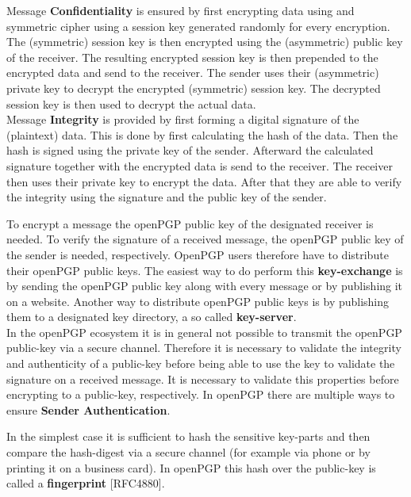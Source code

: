 Message \textbf{Confidentiality} is ensured by first encrypting data using and symmetric cipher using a session key generated randomly for every encryption. The (symmetric) session key is then encrypted using the (asymmetric) public key of the receiver. The resulting encrypted session key is then prepended to the encrypted data and send to the receiver. The sender uses their (asymmetric) private key to decrypt the encrypted (symmetric) session key. The decrypted session key is then used to decrypt the actual data.\\


Message \textbf{Integrity} is provided by first forming a digital signature of the (plaintext) data. This is done by first calculating the hash of the data. Then the hash is signed using the private key of the sender. Afterward the calculated signature together with the encrypted data is send to the receiver. The receiver then uses their private key to encrypt the data. After that they are able to verify the integrity using the signature and the public key of the sender.

To encrypt a message the openPGP public key of the designated receiver is needed. To verify the signature of a received message, the openPGP public key of the sender is needed, respectively. OpenPGP users therefore have to distribute their openPGP public keys. The easiest way to do perform this \textbf{key-exchange} is by sending the openPGP public key along with every message or by publishing it on a website. Another way to distribute openPGP public keys is by publishing them to a designated key directory, a so called \textbf{key-server}. \\


In the openPGP ecosystem it is in general not possible to transmit the openPGP public-key via a secure channel. Therefore it is necessary to validate the integrity and authenticity of a public-key before being able to use the key to validate the signature on a received message. It is necessary to validate this properties before encrypting to a public-key, respectively. In openPGP there are multiple ways to ensure \textbf{Sender Authentication}.

In the simplest case it is sufficient to hash the sensitive key-parts and then compare the hash-digest via a secure channel (for example via phone or by printing it on a business card). In openPGP this hash over the public-key is called a \textbf{fingerprint} [RFC4880].

